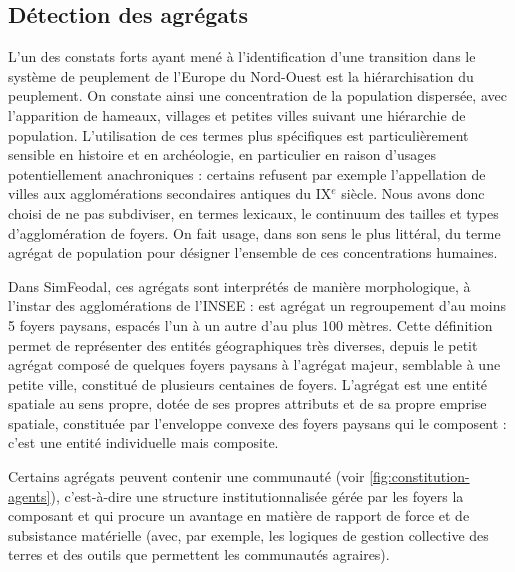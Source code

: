 \subsection{Détection des agrégats \label{meca-agregats}}

L'un des constats forts ayant mené à l'identification d'une \og transition\fg{} \autocite{pumain_convergences_2017, nuninger_cadre_2017} dans le système de peuplement de l'Europe du Nord-Ouest est la hiérarchisation du peuplement.
On constate ainsi une concentration de la population dispersée, avec l'apparition de hameaux, villages et petites villes suivant une hiérarchie de population.
L'utilisation de ces termes plus spécifiques est particulièrement sensible en histoire et en archéologie, en particulier en raison d'usages potentiellement anachroniques : certains refusent par exemple l'appellation de villes aux agglomérations secondaires antiques du IX$^e$ siècle.
Nous avons donc choisi de ne pas subdiviser, en termes lexicaux, le continuum des tailles et types d'agglomération de foyers.
On fait usage, dans son sens le plus littéral, du terme \og agrégat\fg{} de population pour désigner l'ensemble de ces concentrations humaines.

\begin{tcolorbox}[breakable,left=0pt,right=0pt,top=0pt,bottom=0pt,
	colback=gray!15,colframe=gray!15,width=\dimexpr\textwidth\relax, 
	enlarge left by=0mm, boxsep=5pt,arc=0pt,outer arc=0pt]

Dans SimFeodal, ces agrégats sont interprétés de manière morphologique, à l'instar des agglomérations de l'INSEE : est agrégat un regroupement d'au moins 5 foyers paysans, espacés l'un à un autre d'au plus 100 mètres.
Cette définition permet de représenter des entités géographiques très diverses, depuis le petit agrégat composé de quelques foyers paysans à l'agrégat majeur, semblable à une petite ville, constitué de plusieurs centaines de foyers.
L'agrégat est une entité spatiale au sens propre, dotée de ses propres attributs et de sa propre emprise spatiale, constituée par l'enveloppe convexe des foyers paysans qui le composent : c'est une entité individuelle mais composite.
\end{tcolorbox}

Certains agrégats peuvent contenir une \og communauté\fg{} (voir \cref{fig:constitution-agents}), c'est-à-dire une structure institutionnalisée gérée par les foyers la composant et qui procure un avantage en matière de rapport de force et de subsistance matérielle (avec, par exemple, les logiques de gestion collective des terres et des outils que permettent les communautés agraires).

